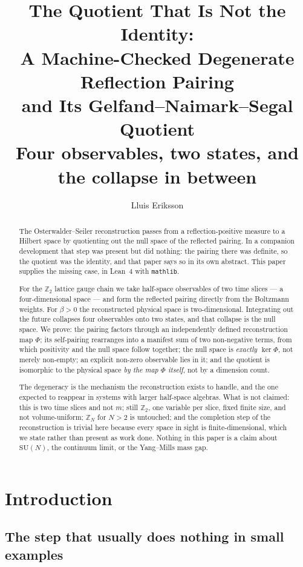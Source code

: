 \documentclass[11pt]{article}
\title{The Quotient That Is Not the Identity:\\
A Machine-Checked Degenerate Reflection Pairing\\
and Its Gelfand--Naimark--Segal Quotient\\
\large Four observables, two states, and the collapse in between}
\author{Lluis Eriksson}
\date{}
\theoremstyle{definition}
\newcommand{\Z}{\mathbb{Z}}
\newcommand{\SU}{\mathrm{SU}}
\begin{document}
\maketitle

\begin{abstract}
The Osterwalder--Seiler reconstruction passes from a reflection-positive measure
to a Hilbert space by quotienting out the null space of the reflected pairing.
In a companion development that step was present but did nothing: the pairing
there was definite, so the quotient was the identity, and that paper says so in
its own abstract.  This paper supplies the missing case, in Lean~4 with
\texttt{mathlib}.

For the $\Z_2$ lattice gauge chain we take half-space observables of two time
slices --- a four-dimensional space --- and form the reflected pairing directly
from the Boltzmann weights.  For $\beta>0$ the reconstructed physical space is
two-dimensional.  Integrating out the future collapses four observables onto two
states, and that collapse is the null space.  We prove: the pairing factors through an
independently defined reconstruction map $\Phi$; its self-pairing rearranges
into a manifest sum of two non-negative terms, from which positivity and the
null space follow together; the null space is \emph{exactly} $\ker\Phi$, not
merely non-empty; an explicit non-zero observable lies in it; and the quotient is
isomorphic to the physical space \emph{by the map $\Phi$ itself}, not by a
dimension count.

The degeneracy is the mechanism the reconstruction exists to handle, and the one
expected to reappear in systems with larger half-space algebras.  What is not claimed: this is two
time slices and not $m$; still $\Z_2$, one variable per slice, fixed finite
size, and not volume-uniform; $\Z_N$ for $N>2$ is untouched; and the completion
step of the reconstruction is trivial here because every space in sight is
finite-dimensional, which we state rather than present as work done.  Nothing in
this paper is a claim about $\SU(N)$, the continuum limit, or the Yang--Mills
mass gap.
\end{abstract}

\section{Introduction}

\subsection{The step that usually does nothing in small examples}
\end{document}
